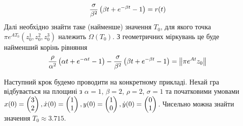 \begin{example}
\begin{gather*}
        \frac{\sigma}{\beta^2}\left(\beta t + e^{-\beta t} - 1\right) = r(t)
    \end{gather*}
    Далі необхідно знайти таке (найменше) значення $T_0$, для якого точка $\pi e^{A T_0}(z^1_0, z^2_0, z^3_0)$ належить
    $\Omega(T_0)$. З геометричних міркувань це буде найменший корінь рівняння
    \begin{gather*}
        \frac{\rho}{\alpha^2}\left(\alpha t + e^{-\alpha t} - 1\right) - 
        \frac{\sigma}{\beta^2}\left(\beta t + e^{-\beta t} - 1\right) = \left\Vert \pi e^{A t} z_0 \right\Vert
    \end{gather*}
    
    Наступний крок будемо проводити на конкретному прикладі. Нехай гра відбувається на площині з 
    $\alpha=1$, $\beta=2$, $\rho=2$, $\sigma=1$ та
    початковими умовами $x(0) = \begin{pmatrix}
        3 \\ 2
    \end{pmatrix}, \dot{x}(0) = \begin{pmatrix}
        1 \\ 1
    \end{pmatrix}, y(0) = \begin{pmatrix}
        1 \\ 0
    \end{pmatrix}, \dot{y}(0) = \begin{pmatrix}
        0 \\ 1
    \end{pmatrix}$. Чисельно можна знайти значення $T_0 \approx 3.715$.
    \begin{center}
        
    \end{center}
\end{example}
